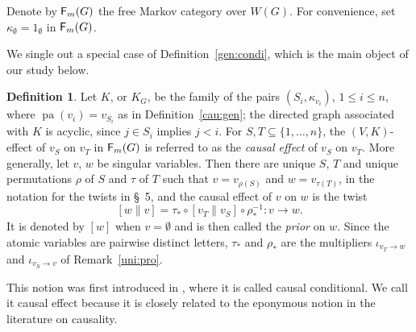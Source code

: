 \documentclass[12pt]{amsart}
\theoremstyle{plain}
\theoremstyle{definition}
\newtheorem{defn}[thm]{Definition}
\theoremstyle{remark}
\numberwithin{equation}{section}
\theoremstyle{plain}
\newcommand{\0}{\emptyset}
\newcommand{\fun}{\longrightarrow}
\newcommand{\sub}{\subseteq}
\newcommand{\cat}[1]{\textup{\textsf{#1}}}
\DeclareMathOperator{\cau}{\cat F_{\text{$m$}}}
\DeclareMathOperator{\pa}{pa}
\newcommand{\memph}[1]{{\color{magenta}\emph{#1}}}
\begin{document}
Denote by $\cau(G)$ the free  Markov category over $W(G)$. For convenience, set $\kappa_\0 = 1_\0$ in $\cau(G)$.

We single out a special case of Definition~\ref{gen:condi}, which is the main object of our study below.


\begin{defn}\label{cau:condi}
Let $K$, or $K_G$, be the family of the pairs $(S_i, \kappa_{v_i})$, $1 \leq i \leq n$, where $\pa(v_i) = v_{S_i}$ as in Definition~\ref{cau:gen}; the directed graph associated with $K$ is acyclic, since $j \in S_i$ implies $j < i$. For $S, T \sub \{1, \ldots, n\}$, the $(V, K)$-effect of $v_S$ on $v_T$ in $\cau(G)$ is referred to as the \memph{causal effect} of $v_S$ on $v_T$. More generally, let $v$, $w$ be singular variables. Then there are unique $S$, $T$ and unique permutations $\rho$ of $S$ and $\tau$ of $T$ such that $v = v_{\rho(S)}$ and $w = v_{\tau(T)}$, in the notation for the twists in \S~5, and the causal effect of $v$ on $w$ is the twist
\[
[w \| v] = \tau_* \circ [v_T \| v_S] \circ \rho_*^{-1} : v \fun w.
\]
It is denoted by $[w]$ when $v = \0$ and is then called the \memph{prior} on $w$. Since the atomic variables are pairwise distinct letters, $\tau_*$ and $\rho_*$ are the multipliers $\iota_{v_T \rightarrow w}$ and $\iota_{v_S \rightarrow v}$ of Remark~\ref{uni:pro}.
\end{defn}

This notion was first introduced in \cite[\S~4]{Fong:thesis}, where it is called causal conditional.  We call it causal effect because it is closely related to the eponymous notion in the literature on causality.
\end{document}
